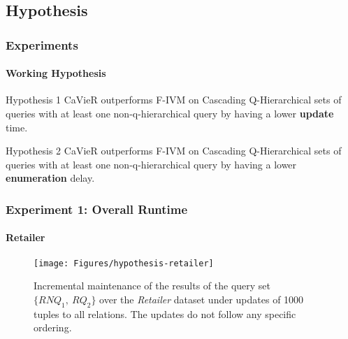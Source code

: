 \documentclass[
	11pt, %
]{beamer}
\begin{document}
\subsection{Hypothesis}
\begin{frame}
	\frametitle{Experiments}
	\framesubtitle{Working Hypothesis}
	\begin{block}{Hypothesis 1 }\label{hyp:initialUpdate}
		CaVieR outperforms F-IVM on Cascading Q-Hierarchical sets of queries with at least one non-q-hierarchical query by having a lower \textbf{update} time.
	\end{block}
	
	\begin{block}{Hypothesis 2}\label{hyp:initialEnumeration}
		CaVieR outperforms F-IVM on Cascading Q-Hierarchical sets of queries with at least one non-q-hierarchical query by having a lower \textbf{enumeration} delay.
	\end{block}

\end{frame}




\begin{frame}
	\frametitle{Experiment 1: Overall Runtime}
	\framesubtitle{Retailer}
	\begin{figure}
		\begin{minipage}{0.25\textwidth}
		\end{minipage}
		\begin{minipage}{0.74\textwidth}
			\texttt{[image: Figures/hypothesis-retailer]} %
		\end{minipage}
		\caption{Incremental maintenance of the results of the query set $\{RNQ_1,\ RQ_2\}$ over the {\em Retailer} dataset under updates of 1000 tuples to all relations. The updates do not follow any specific ordering. }
	\end{figure}
\end{frame}
\end{document}

